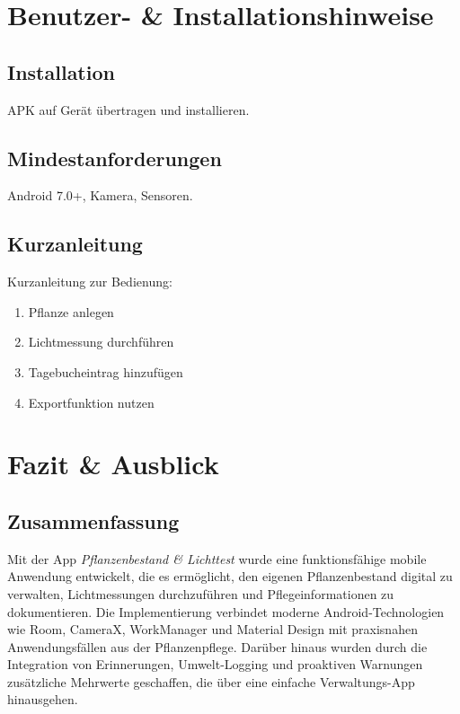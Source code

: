 \documentclass[14pt,a4paper]{report}
\begin{document}
\chapter{Benutzer- \& Installationshinweise}
\section{Installation}
APK auf Gerät übertragen und installieren.

\section{Mindestanforderungen}
Android 7.0+, Kamera, Sensoren.

\section{Kurzanleitung}
Kurzanleitung zur Bedienung:
\begin{enumerate}
    \item Pflanze anlegen
    \item Lichtmessung durchführen
    \item Tagebucheintrag hinzufügen
    \item Exportfunktion nutzen
\end{enumerate}

\chapter{Fazit \& Ausblick}

\section{Zusammenfassung}
Mit der App \textit{Pflanzenbestand \& Lichttest} wurde eine funktionsfähige mobile Anwendung entwickelt, die es ermöglicht,
den eigenen Pflanzenbestand digital zu verwalten, Lichtmessungen durchzuführen und Pflegeinformationen zu dokumentieren. 
Die Implementierung verbindet moderne Android-Technologien wie Room, CameraX, WorkManager und Material Design 
mit praxisnahen Anwendungsfällen aus der Pflanzenpflege.  
Darüber hinaus wurden durch die Integration von Erinnerungen, Umwelt-Logging und proaktiven Warnungen zusätzliche Mehrwerte geschaffen,
die über eine einfache Verwaltungs-App hinausgehen.
\end{document}
